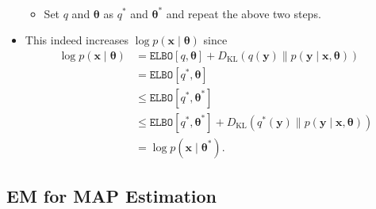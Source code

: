 \documentclass[10pt]{article}
\newcommand{\elbo}{\texttt{ELBO}}
\newcommand{\KL}{D_{\text{KL}}}
\begin{document}
\begin{itemize}
\begin{itemize}
\begin{align*}
\end{align*}
\item Set $q$ and $\bm{\theta}$ as $q^*$ and $\bm{\theta}^*$ and repeat the above two steps.
\end{itemize}
\item This indeed increases $\log p(\bm{x} \mid \bm{\theta})$ since
\begin{align*}
\log p(\bm{x} \mid \bm{\theta}) &= \elbo[q,\bm{\theta}] + \KL(q(\bm{y}) \| p(\bm{y} \mid \bm{x}, \bm{\theta})) \\
&= \elbo[q^*,\bm{\theta}] \\
&\leq \elbo[q^*,\bm{\theta}^*] \\
&\leq \elbo[q^*,\bm{\theta}^*] + \KL(q^*(\bm{y}) \| p(\bm{y} \mid \bm{x}, \bm{\theta})) \\
&= \log p(\bm{x} \mid \bm{\theta}^*).
\end{align*}
\end{itemize}

\subsection{EM for MAP Estimation}
\end{document}
